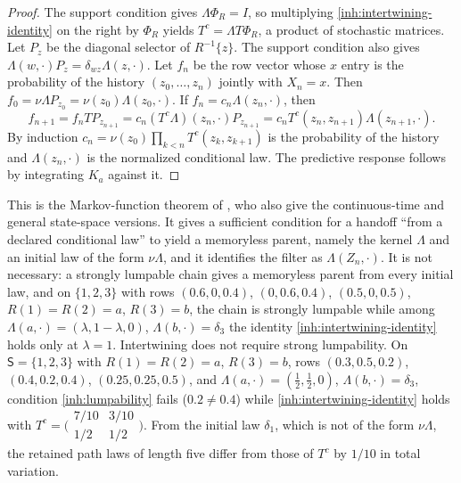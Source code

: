 \begin{proof}
The support condition gives $\Lambda\Phi_R=I$, so multiplying
\cref{inh:intertwining-identity} on the right by $\Phi_R$ yields
$T^c=\Lambda T\Phi_R$, a product of stochastic matrices. Let $P_z$ be the
diagonal selector of $R^{-1}\{z\}$. The support condition also gives
$\Lambda(w,\cdot)P_z=\delta_{wz}\Lambda(z,\cdot)$. Let $f_n$ be the row
vector whose $x$ entry is the probability of the history
$(z_0,\ldots,z_n)$ jointly with $X_n=x$. Then
$f_0=\nu\Lambda P_{z_0}=\nu(z_0)\Lambda(z_0,\cdot)$. If
$f_n=c_n\Lambda(z_n,\cdot)$, then
\begin{equation}
 f_{n+1}=f_nTP_{z_{n+1}}
 =c_n(T^c\Lambda)(z_n,\cdot)P_{z_{n+1}}
 =c_nT^c(z_n,z_{n+1})\Lambda(z_{n+1},\cdot).
\end{equation}
By induction $c_n=\nu(z_0)\prod_{k<n}T^c(z_k,z_{k+1})$ is the probability
of the history and $\Lambda(z_n,\cdot)$ is the normalized conditional law.
The predictive response follows by integrating $K_a$ against it.
\end{proof}

This is the Markov-function theorem of \citet{RogersPitman1981}, who also
give the continuous-time and general state-space versions. It gives a
sufficient condition for a handoff ``from a declared conditional law'' to
yield a memoryless parent, namely the kernel $\Lambda$ and an initial law of
the form $\nu\Lambda$, and it identifies the filter as $\Lambda(Z_n,\cdot)$.
It is not necessary: a strongly lumpable chain gives a memoryless parent
from every initial law, and on $\{1,2,3\}$ with rows $(0.6,0,0.4)$,
$(0,0.6,0.4)$, $(0.5,0,0.5)$, $R(1)=R(2)=a$, $R(3)=b$, the chain is strongly
lumpable while among $\Lambda(a,\cdot)=(\lambda,1-\lambda,0)$,
$\Lambda(b,\cdot)=\delta_3$ the identity \cref{inh:intertwining-identity}
holds only at $\lambda=1$. Intertwining does not require strong
lumpability. On
$\mathsf S=\{1,2,3\}$ with $R(1)=R(2)=a$, $R(3)=b$, rows
$(0.3,0.5,0.2)$, $(0.4,0.2,0.4)$, $(0.25,0.25,0.5)$, and
$\Lambda(a,\cdot)=(\tfrac12,\tfrac12,0)$, $\Lambda(b,\cdot)=\delta_3$,
condition \cref{inh:lumpability} fails ($0.2\neq0.4$) while
\cref{inh:intertwining-identity} holds with
$T^c=\bigl(\begin{smallmatrix}7/10&3/10\\1/2&1/2\end{smallmatrix}\bigr)$.
From the initial law $\delta_1$, which is not of the form $\nu\Lambda$, the
retained path laws of length five differ from those of $T^c$ by $1/10$ in
total variation.

